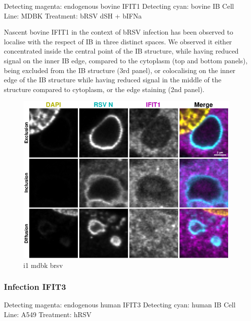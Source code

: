 Detecting magenta: endogenous bovine IFIT1 \newline
Detecting cyan: bovine IB \newline
Cell Line: MDBK \newline
Treatment: bRSV dSH + bIFNa \newline

Nascent bovine IFIT1 in the context of bRSV infection has been observed to localise with the respect of IB in three distinct spaces. We observed it either concentrated inside the central point of the IB structure, while having reduced signal on the inner IB edge, compared to the cytoplasm (top and bottom panels), being excluded from the IB structure (3rd panel), or colocalising on the inner edge of the IB structure while having reduced signal in the middle of the structure compared to cytoplasm, or the edge staining (2nd panel).

\begin{figure}
    \centering
    \includegraphics[width=1\linewidth]{09. Chapter 4/Figs/02. Infection/03. mdbk i1.pdf}
    \caption[i1 mdbk brsv]{i1 mdbk brsv}
    \label{fig:i1 mdbk brsv}
\end{figure}

\subsubsection{Infection IFIT3}
Detecting magenta: endogenous human IFIT3 \newline
Detecting cyan: human IB \newline
Cell Line: A549 \newline
Treatment: hRSV \newline

